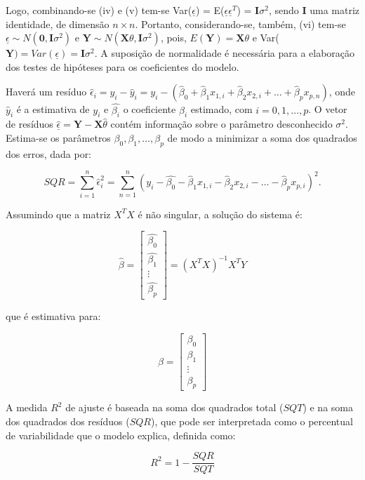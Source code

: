 \documentclass[
	12pt,				%
	a4paper,		%
	oneside,    %
	chapter=TITLE,		   %
	section=TITLE,		   %
	subsection=TITLE,	   %
	subsubsection=TITLE, %
	english,			%
	french,				%
	spanish,			%
	brazil,				%
]{abntex2}
\begin{document}
Logo, combinando-se (iv) e (v) tem-se Var(\(\underline{ \epsilon}\)) =
E(\(\underline{ \epsilon} \underline{ \epsilon}^T\)) =
\(\textbf{I}\sigma^2\), sendo \(\textbf{I}\) uma matriz identidade, de
dimensão \(n \times n\). Portanto, considerando-se, também, (vi) tem-se
\(\underline{ \epsilon} \sim N(\textbf{0},\textbf{I}\sigma^2)\) e
\(\textbf{Y} \sim N(\textbf{X}\theta, \textbf{I}\sigma^2)\), pois,
\(E(\textbf{Y}) = \textbf{X}\theta\) e
Var(\(\textbf{Y}) = Var(\underline{ \epsilon}) = \textbf{I}\sigma^2\). A
suposição de normalidade é necessária para a elaboração dos testes de
hipóteses para os coeficientes do modelo.

Haverá um resíduo
\(\hat{\epsilon}_i = y_i - \hat{y}_i = y_i - (\hat{\beta}_0 + \hat{\beta}_1x_{1,i} + \hat{\beta}_2x_{2,i} + \dots + \hat{\beta}_px_{p,n})\),
onde \(\hat{y}_i\) é a estimativa de \(y_i\) e \(\hat{\beta_i}\) o
coeficiente \(\beta_i\) estimado, com \(i = 0,1,\dots , p\). O vetor de
resíduos
\(\underline{\hat{\epsilon}} = \textbf{Y} - \textbf{X}\hat{\theta}\)
contém informação sobre o parâmetro desconhecido \(\sigma^2\). Estima-se
os parâmetros \(\beta_0,\beta_1,\dots,\beta_p\) de modo a minimizar a
soma dos quadrados dos erros, dada por:

\[SQR = \sum_{i=1}^n \hat{\epsilon}^2_i = \sum_{n=1}^n (y_i- \hat{\beta_0} - \hat{\beta}_1x_{1,i} - \hat{\beta}_2x_{2,i}- \dots - \hat{\beta}_px_{p,i})^2.\]

Assumindo que a matriz \(X^TX\) é não singular, a solução do sistema é:

\[
\hat{\beta}
=
\begin{bmatrix}
\hat{\beta_0} \\
\hat{\beta_1} \\
\vdots \\
\hat{\beta_p}
\end{bmatrix}
=
(X^TX)^{-1}X^TY
\]

que é estimativa para:

\[
\beta =
\begin{bmatrix}
\beta_0 \\
\beta_1 \\
\vdots \\
\beta_p
\end{bmatrix}
\]

A medida \(R^2\) de ajuste é baseada na soma dos quadrados total
(\(SQT\)) e na soma dos quadrados dos resíduos (\(SQR\)), que pode ser
interpretada como o percentual de variabilidade que o modelo explica,
definida como:

\[
R^2 = 1-\frac{SQR}{SQT}
\]
\end{document}
